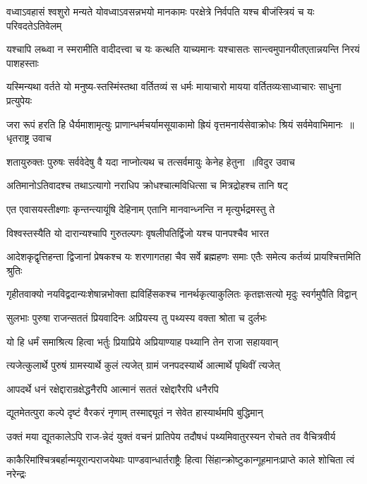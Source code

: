 \twolineshloka
{वध्वाऽवहासं श्वशुरो मन्यते योवध्वाऽवसन्नभयो मानकामः}
{परक्षेत्रे निर्वपति यश्च बीजंस्त्रियं च यः परिवदतेऽतिवेलम्}


\twolineshloka
{यश्चापि लब्ध्वा न स्मरामीति वादीदत्त्वा च यः कत्थति याच्यमानः}
{यश्चासतः सान्त्वमुपानयीतएतान्नयन्ति निरयं पाशहस्ताः}


\twolineshloka
{यस्मिन्यथा वर्तते यो मनुष्य-स्तस्मिंस्तथा वर्तितव्यं स धर्मः}
{मायाचारो मायया वर्तितव्यःसाध्वाचारः साधुना प्रत्युपेयः}


\twolineshloka
{जरा रूपं हरति हि धैर्यमाशामृत्युः प्राणान्धर्मचर्यामसूयाकामो ह्रियं वृत्तमनार्यसेवाक्रोधः श्रियं सर्वमेवाभिमानः ॥धृतराष्ट्र उवाच}
{}


\threelineshloka
{शतायुरुक्तः पुरुषः सर्ववेदेषु वै यदा}
{नाप्नोत्यथ च तत्सर्वमायुः केनेह हेतुना ॥विदुर उवाच}
{}


\twolineshloka
{अतिमानोऽतिवादश्च तथाऽत्यागो नराधिप}
{क्रोधश्चात्मविधित्सा च मित्रद्रोहश्च तानि षट्}


\twolineshloka
{एत एवासयस्तीक्ष्णाः कृन्तन्त्यायूंषि देहिनाम्}
{एतानि मानवान्ध्नन्ति न मृत्युर्भद्रमस्तु ते}


\twolineshloka
{विश्वस्तस्यैति यो दारान्यश्चापि गुरुतल्पगः}
{वृषलीपतिर्द्विजो यश्च पानपश्चैव भारत}


\threelineshloka
{आदेशकृद्वृत्तिहन्ता द्विजानां प्रेषकश्च यः}
{शरणागतहा चैव सर्वे ब्रह्महणः समाः}
{एतैः समेत्य कर्तव्यं प्रायश्चित्तमिति श्रुतिः}


\twolineshloka
{गृहीतवाक्यो नयविद्वदान्यःशेषान्नभोक्ता ह्यविहिंसकश्च}
{नानर्थकृत्याकुलितः कृतज्ञःसत्यो मृदुः स्वर्गमुपैति विद्वान्}


\twolineshloka
{सुलभाः पुरुषा राजन्सततं प्रियवादिनः}
{अप्रियस्य तु पथ्यस्य वक्ता श्रोता च दुर्लभः}


\twolineshloka
{यो हि धर्मं समाश्रित्य हित्वा भर्तुः प्रियाप्रिये}
{अप्रियाण्याह पथ्यानि तेन राजा सहायवान्}


\twolineshloka
{त्यजेत्कुलार्थे पुरुषं ग्रामस्यार्थे कुलं त्यजेत्}
{ग्रामं जनपदस्यार्थे आत्मार्थे पृथिवीं त्यजेत्}


\twolineshloka
{आपदर्थे धनं रक्षेद्दारान्रक्षेद्धनैरपि}
{आत्मानं सततं रक्षेद्दारैरपि धनैरपि}


\twolineshloka
{द्यूतमेतत्पुरा कल्पे दृष्टं वैरकरं नृणाम्}
{तस्माद्द्यूतं न सेवेत हास्यार्थमपि बुद्धिमान्}


\twolineshloka
{उक्तं मया द्यूतकालेऽपि राज-न्नेदं युक्तं वचनं प्रातिपेय}
{तदौषधं पथ्यमिवातुरस्यन रोचते तव वैचित्रवीर्य}


\twolineshloka
{काकैरिमांश्चित्रबर्हान्मयूरान्पराजयेथाः पाण्डवान्धार्तराष्ट्रैः}
{हित्वा सिंहान्क्रोष्टुकान्गूहमानःप्राप्ते काले शोचिता त्वं नरेन्द्रः}


